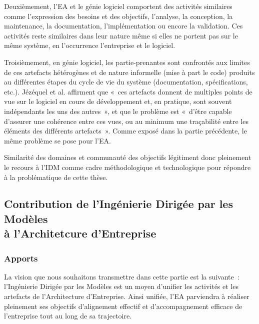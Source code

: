     Deuxièmement, l'EA et le génie logiciel comportent des activités
    similaires comme l'expression des besoins et des objectifs, l'analyse,
    la conception, la maintenance, la documentation, l'implémentation ou encore
    la validation. Ces activités reste similaires dans leur nature même
    si elles ne portent pas sur le même système, en l'occurrence l'entreprise et
    le logiciel.

    Troisièmement, en génie logiciel, les partie-prenantes sont
    confrontés aux limites de ces artefacts hétérogènes et de nature informelle (mise à
    part le code) produits au différentes étapes du cycle de vie du système (documentation,
    spécifications, etc.). Jézéquel et al. \cite{jezequel2006genie} affirment
    que «~ces artefacts donnent de multiples points de vue sur le
    logiciel en cours de développement et, en pratique, sont souvent
    indépendants les uns des autres~», et que le problème est «~d’être
    capable d'assurer une cohérence entre ces vues, ou au minimum une
    traçabilité entre les éléments des différents artefacts~».
    Comme exposé dans la partie précédente, le même problème se pose pour l'EA.


    Similarité des domaines et communauté des objectifs légitiment
    donc pleinement le recours à l'IDM comme cadre
    méthodologique et technologique pour répondre à la problématique de
    cette thèse.

    \subsection{Contribution de l'Ingénierie Dirigée par les Modèles\\à l'Architetcure d'Entreprise}

    \subsubsection{Apports}

    La vision que nous souhaitons transmettre dans cette partie est la suivante~:
    l'Ingénierie Dirigée par les Modèles est un moyen d'unifier les activités
    et les artefacts de l'Architecture d'Entreprise. Ainsi unifiée, l'EA parviendra à réaliser
    pleinement ses objectifs d'alignement effectif et d'accompagnement efficace de
    l'entreprise tout au long de sa trajectoire.

